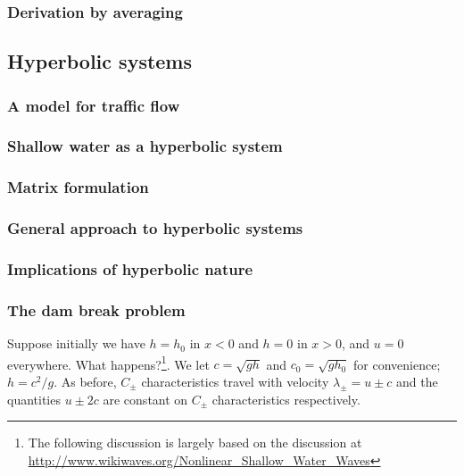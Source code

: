 \subsubsection{Derivation by averaging}

\subsection{Hyperbolic systems}
\subsubsection{A model for traffic flow}
\subsubsection{Shallow water as a hyperbolic system}
\subsubsection{Matrix formulation}
\subsubsection{General approach to hyperbolic systems}
\subsubsection{Implications of hyperbolic nature}
\clearpage
\subsubsection{The dam break problem}

Suppose initially we have $h = h_0$ in $x<0$ and $h=0$ in $x>0$, and $u=0$ everywhere. What happens?\footnote{The following discussion is largely based on the discussion at \url{http://www.wikiwaves.org/Nonlinear_Shallow_Water_Waves}}. We let $c = \sqrt{gh}$ and $c_0 = \sqrt{gh_0}$ for convenience; $h = c^2/g$. As before, $C_\pm$ characteristics travel with velocity $\lambda_\pm=u\pm c$ and the quantities $u\pm2c$ are constant on $C_\pm$ characteristics respectively. 

